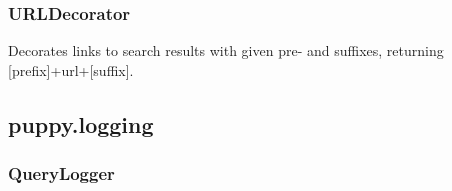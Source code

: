 \documentclass[letterpaper,10pt,english]{sphinxmanual}
\begin{document}
\subsubsection{URLDecorator}
\label{api2.0:urldecorator}

\begin{fulllineitems}
\label{api2.0:puppy.result.modifier.URLDecorator}
Decorates links to search results with given pre- and suffixes, returning {[}prefix{]}+url+{[}suffix{]}.

\end{fulllineitems}



\subsection{puppy.logging}
\label{api2.0:module-puppy.logging}\label{api2.0:puppy-logging}

\subsubsection{QueryLogger}
\label{api2.0:querylogger}
\end{document}
